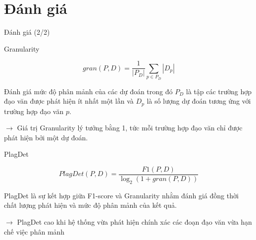 \documentclass[aspectratio=169,11pt]{beamer}
\def\textbf#1{#1}%
\begin{document}
\section{Đánh giá}
\begin{frame}{Đánh giá (2/2)}

\small

\begin{block}{Granularity}

\[
gran(P,D)=
\frac{1}{|P_D|}
\sum_{p\in P_D}|D_p|
\]

Đánh giá mức độ phân mảnh của các dự đoán trong đó $P_D$ là tập các trường hợp đạo văn được phát hiện ít nhất một lần và $D_p$ là số lượng dự đoán tương ứng với trường hợp đạo văn $p$.

$\rightarrow$ Giá trị Granularity lý tưởng bằng 1, tức mỗi trường hợp đạo văn chỉ được phát
hiện bởi một dự đoán.

\end{block}

\vspace{0.3cm}

\begin{block}{PlagDet}

\[
PlagDet(P,D)=
\frac{F1(P,D)}
{\log_2(1+gran(P,D))}
\]

PlagDet là sự kết hợp giữa F1-score và Granularity nhằm đánh giá đồng thời chất lượng phát hiện và mức độ phân mảnh của kết quả. 

$\rightarrow$ PlagDet cao khi hệ thống vừa phát hiện chính xác các đoạn đạo văn vừa hạn chế việc phân mảnh


\end{block}

\end{frame}




\end{document}
